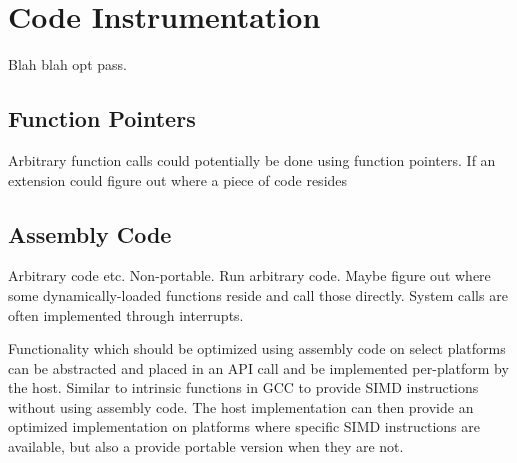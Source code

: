 \chapter {Code Instrumentation}

Blah blah opt pass.

\section {Function Pointers}

Arbitrary function calls could potentially be done using function pointers. If
an extension could figure out where a piece of code resides

\section {Assembly Code}

Arbitrary code etc. Non-portable. Run arbitrary code. Maybe figure out where
some dynamically-loaded functions reside and call those directly. System calls
are often implemented through interrupts. 

Functionality which should be optimized using assembly code on select platforms
can be abstracted and placed in an API call and be implemented per-platform by
the host. Similar to intrinsic functions in GCC to provide SIMD instructions
without using assembly code. The host implementation can then provide an
optimized implementation on platforms where specific SIMD instructions are
available, but also a provide portable version when they are not.
